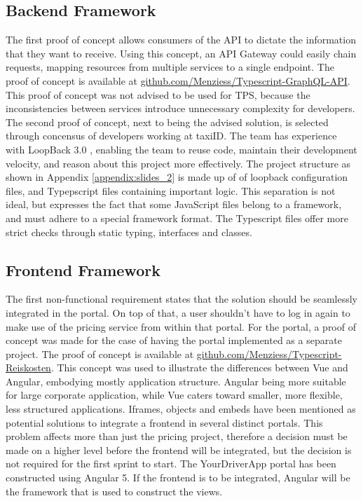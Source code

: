 \subsection{Backend Framework}
The first proof of concept allows consumers of the API to dictate the information that they want to receive. Using this concept, an API Gateway could easily chain requests, mapping resources from multiple services to a single endpoint. The proof of concept is available at \url{github.com/Menziess/Typescript-GraphQL-API}. This proof of concept was not advised to be used for TPS, because the inconsistencies between services introduce unnecessary complexity for developers. The second proof of concept, next to being the advised solution, is selected through concensus of developers working at taxiID. The team has experience with LoopBack 3.0 \cite{lb}, enabling the team to reuse code, maintain their development velocity, and reason about this project more effectively. The project structure as shown in Appendix \ref{appendix:slides_2} is made up of of loopback configuration files, and Typepscript files containing important logic. This separation is not ideal, but expresses the fact that some JavaScript files belong to a framework, and must adhere to a special framework format. The Typescript files offer more strict checks through static typing, interfaces and classes.

\subsection{Frontend Framework}
The first non-functional requirement states that the solution should be seamlessly integrated in the portal. On top of that, a user shouldn’t have to log in again to make use of the pricing service from within that portal. For the portal, a proof of concept was made for the case of having the portal implemented as a separate project. The proof of concept is available at \url{github.com/Menziess/Typescript-Reiskosten}. This concept was used to illustrate the differences between Vue and Angular, embodying mostly application structure. Angular being more suitable for large corporate application, while Vue caters toward smaller, more flexible, less structured applications. Iframes, objects and embeds have been mentioned as potential solutions to integrate a frontend in several distinct portals. This problem affects more than just the pricing project, therefore a decision must be made on a higher level before the frontend will be integrated, but the decision is not required for the first sprint to start. The YourDriverApp portal has been constructed using Angular 5. If the frontend is to be integrated, Angular will be the framework that is used to construct the views.

